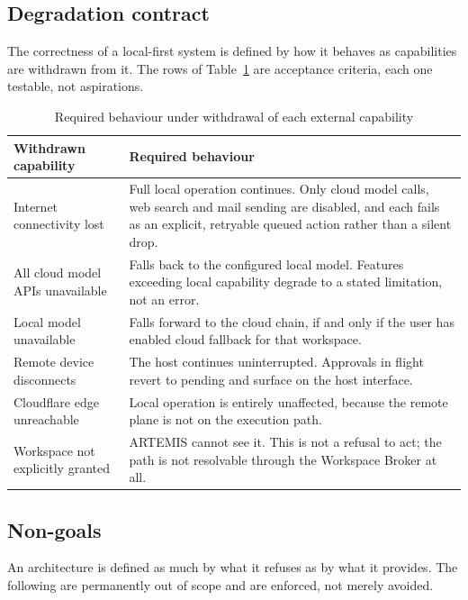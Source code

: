 \documentclass[11pt]{article}
\begin{document}
\subsection{Degradation contract}

The correctness of a local-first system is defined by how it behaves as capabilities are
withdrawn from it. The rows of Table~\ref{tab:degradation} are acceptance criteria, each
one testable, not aspirations.

\begin{table}[htbp]
\centering
\small
\caption{Required behaviour under withdrawal of each external capability}
\label{tab:degradation}
\begin{tabular}{@{}p{}p{}@{}}
\toprule
\textbf{Withdrawn capability} & \textbf{Required behaviour} \\
\midrule
Internet connectivity lost &
Full local operation continues. Only cloud model calls, web search and mail sending are
disabled, and each fails as an explicit, retryable queued action rather than a silent
drop. \\
\addlinespace
All cloud model APIs unavailable &
Falls back to the configured local model. Features exceeding local capability degrade to
a stated limitation, not an error. \\
\addlinespace
Local model unavailable &
Falls forward to the cloud chain, if and only if the user has enabled cloud fallback for
that workspace. \\
\addlinespace
Remote device disconnects &
The host continues uninterrupted. Approvals in flight revert to pending and surface on
the host interface. \\
\addlinespace
Cloudflare edge unreachable &
Local operation is entirely unaffected, because the remote plane is not on the execution
path. \\
\addlinespace
Workspace not explicitly granted &
ARTEMIS cannot see it. This is not a refusal to act; the path is not resolvable through
the Workspace Broker at all. \\
\bottomrule
\end{tabular}
\end{table}

\subsection{Non-goals}

An architecture is defined as much by what it refuses as by what it provides. The
following are permanently out of scope and are enforced, not merely avoided.
\end{document}
